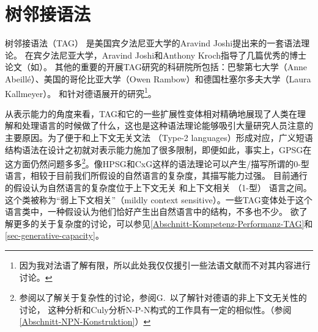 
\chapter{树邻接语法}
\label{Kapitel-TAG}

\newcommand{\dotted}[0]{\makedash{2pt}}
\newcommand{\g}[1]{{\footnotesize $#1$}}

树邻接语法（TAG）
是美国宾夕法尼亚大学的Aravind Joshi提出来的一套语法理论\citep*{JLT75a-u}。
在宾夕法尼亚大学，Aravind Joshi和Anthony Kroch指导了几篇优秀的博士论文（如\citealp{Rambow94a}）。
其他的重要的开展TAG研究的科研院所包括：巴黎第七大学（Anne Abeill\'{e}）、美国的哥伦比亚大学（Owen Rambow）和德国杜塞尔多夫大学（Laura Kallmeyer）。
和针对德语展开的研究\footnote{%
  因为我对法语了解有限，所以此处我仅仅援引一些法语文献而不对其内容进行讨论。
}。

从表示能力的角度来看，TAG和它的一些扩展性变体相对精确地展现了人类在理解和处理语言的时候做了什么，这也是这种语法理论能够吸引大量研究人员注意的主要原因。为了便于和上下文无关文法
（Type-2 languages）形成对应，广义短语结构语法\indexgpsgc 在设计之初就对表示能力施加了很多限制，即便如此，事实上，GPSG在这方面仍然问题多多\citep{Shieber85a,Culy85a}\footnote{%
  参阅\citet{Pullum86a}以了解关于复杂性的讨论，参阅G.\ 以了解针对德语的非上下文无关性的讨论，
  这种分析和Culy分析N-P-N构式的工作具有一定的相似性。（参阅\ref{Abschnitt-NPN-Konstruktion}）%
   }。像HPSG\indexhpsgc 和CxG\indexcxgc 这样的语法理论可以产生/描写所谓的0-型语言，相较于目前我们所假设的自然语言的复杂度，其描写能力过强。
目前通行的假设认为自然语言的复杂度位于上下文无关
和上下文相关
 （1-型） 语言之间。这个类被称为“弱上下文相关”（mildly context sensitive）。一些TAG变体处于这个语言类中，一种假设认为他们恰好产生出自然语言中的结构，不多也不少。
欲了解更多的关于复杂度的讨论，可以参见\ref{Abschnitt-Kompetenz-Performanz-TAG}和\ref{sec-generative-capacity}。

